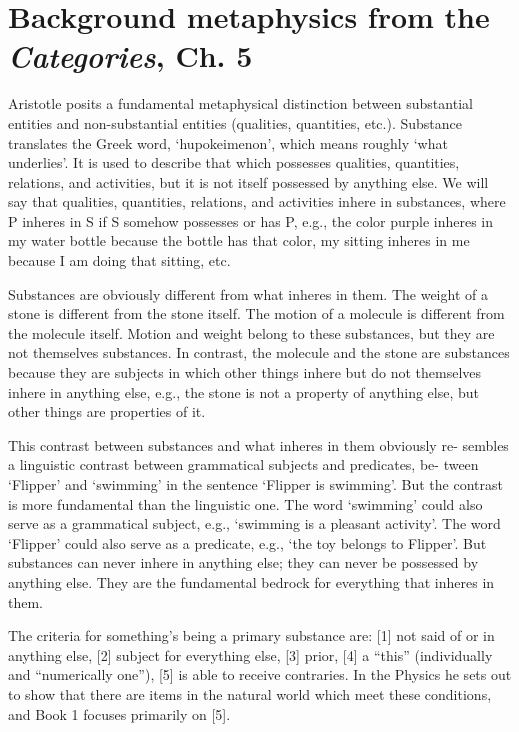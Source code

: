 \documentclass[oneside]{article}
\begin{document}
\thispagestyle{fancy}

\section*{Background metaphysics from the \emph{Categories}, Ch. 5}

Aristotle posits a fundamental metaphysical distinction between substantial entities and non-substantial entities (qualities, quantities, etc.). Substance translates the Greek word, `hupokeimenon', which means roughly `what underlies'. It is used to describe that which possesses qualities, quantities, relations, and activities, but it is not itself possessed by anything else. We will say that qualities, quantities, relations, and activities inhere in substances, where P inheres in S if S somehow possesses or has P, e.g., the color purple inheres in my water bottle because the bottle has that color, my sitting inheres in me because I am doing that sitting, etc.

Substances are obviously different from what inheres in them. The weight of a stone is different from the stone itself. The motion of a molecule is different from the molecule itself. Motion and weight belong to these substances, but they are not themselves substances. In contrast, the molecule and the stone are substances because they are subjects in which other things inhere but do not themselves inhere in anything else, e.g., the stone is not a property of anything else, but other things are properties of it.

This contrast between substances and what inheres in them obviously re- sembles a linguistic contrast between grammatical subjects and predicates, be- tween ‘Flipper’ and ‘swimming’ in the sentence ‘Flipper is swimming’. But the contrast is more fundamental than the linguistic one. The word ‘swimming’ could also serve as a grammatical subject, e.g., ‘swimming is a pleasant activity’. The word ‘Flipper’ could also serve as a predicate, e.g., ‘the toy belongs to Flipper’. But substances can never inhere in anything else; they can never be possessed by anything else. They are the fundamental bedrock for everything that inheres in them.

The criteria for something’s being a primary substance are: [1] not said of or in anything else, [2] subject for everything else, [3] prior, [4] a “this” (individually and “numerically one”), [5] is able to receive contraries.
In the Physics he sets out to show that there are items in the natural world which meet these conditions, and Book 1 focuses primarily on [5].
\end{document}

